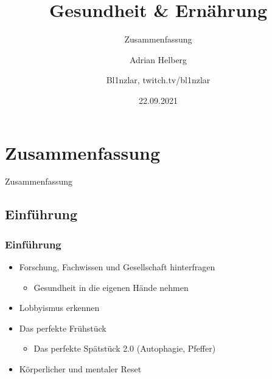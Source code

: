 \documentclass[xcolor=dvipsnames]{beamer}
\title{Gesundheit \& Ernährung}
\subtitle{Zusammenfassung}
\author{Adrian Helberg}
\author{Bl1nzlar, twitch.tv/bl1nzlar}
\date{22.09.2021}
\begin{document}
    \maketitle


    \section{Zusammenfassung}
    {
    \begin{frame}
        \begin{center}
            \Huge Zusammenfassung
        \end{center}
    \end{frame}
    }

    \subsection{Einführung}
    \begin{frame}
        \frametitle{Einführung}
            \begin{itemize}
                \setlength\itemsep{1em}
                \item Forschung, Fachwissen und Gesellschaft hinterfragen
                \begin{itemize}
                    \item Gesundheit in die eigenen Hände nehmen
                \end{itemize}
                \item Lobbyismus erkennen
                \item Das perfekte Frühstück
                \begin{itemize}
                    \item Das perfekte Spätstück 2.0 (Autophagie, Pfeffer)
                \end{itemize}
                \item Körperlicher und mentaler Reset
            \end{itemize}
    \end{frame}
\end{document}
